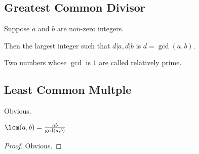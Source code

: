 \documentclass{scrreprt}
\begin{document}
\subsection{Greatest Common Divisor}

Suppose $a$ and $b$ are non-zero integers.

Then the largest integer such that $d|a, d|b$ is $d = \gcd(a, b)$.

Two numbers whose $\gcd$ is $1$ are called relatively prime.

\subsection{Least Common Multple}

Obvious.

\begin{theorem}
	$\lcm(a, b) = \frac{ab}{\gcd(a, b)}$
	\begin{proof}
		Obvious.
	\end{proof}
\end{theorem}
\end{document}
